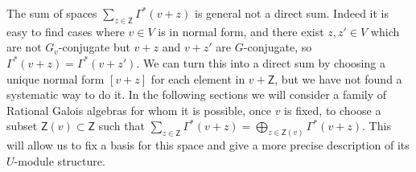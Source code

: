 \documentclass[11pt,fleqn]{article}
\newcommand\Z{\mathsf Z}
\begin{document}
The sum of spaces $\sum_{z \in \Z}\Gamma^*(v+z)$ is general not a direct sum.
Indeed it is easy to find cases where $v \in V$ is in normal form, and 
there exist $z, z' \in V$ which are not $G_v$-conjugate but $v+z$ and $v+z'$
are $G$-conjugate, so $\Gamma^*(v+z) = \Gamma^*(v+z')$. We can turn this into
a direct sum by choosing a unique normal form $[v+z]$ for each element in 
$v+\Z$, but we have not found a systematic way to do it. In the following 
sections we will consider a family of Rational Galois algebras for whom it is
possible, once $v$ is fixed, to choose a subset $\Z(v) \subset \Z$ such that
$\sum_{z \in \Z}\Gamma^*(v+z) = \bigoplus_{z \in \Z(v)} \Gamma^*(v+z)$. This 
will allow us to fix a basis for this space and give a more precise description
of its $U$-module structure.


\begin{bibdiv}
\begin{biblist}
\end{biblist}
\end{bibdiv}
\end{document}
